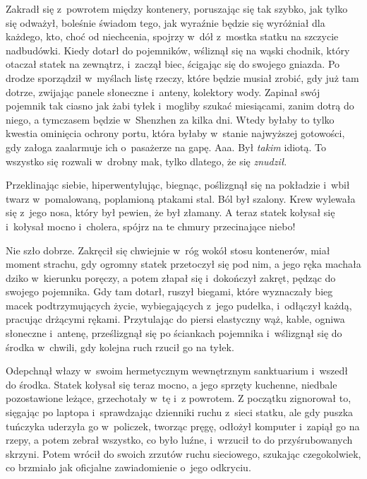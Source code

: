 \documentclass[oneside,polish,11pt,rmheadings]{mwbk}
\begin{document}
Zakradł się z~powrotem między kontenery, poruszając się tak szybko, jak tylko się odważył, boleśnie świadom tego, jak wyraźnie będzie się wyróżniał dla każdego, kto, choć od niechcenia, spojrzy w~dół z~mostka statku na szczycie nadbudówki. Kiedy dotarł do pojemników, wśliznął się na wąski chodnik, który otaczał statek na zewnątrz, i~zaczął biec, ścigając się do swojego gniazda. Po drodze sporządził w~myślach listę rzeczy, które będzie musiał zrobić, gdy już tam dotrze, zwijając panele słoneczne i~anteny, kolektory wody. Zapinał swój pojemnik tak ciasno jak żabi tyłek i~mogliby szukać miesiącami, zanim dotrą do niego, a tymczasem będzie w~Shenzhen za kilka dni. Wtedy byłaby to tylko kwestia ominięcia ochrony portu, która byłaby w~stanie najwyższej gotowości, gdy załoga zaalarmuje ich o~pasażerze na gapę. Aaa. Był \textit{takim }idiotą. To wszystko się rozwali w~drobny mak, tylko dlatego, że się \textit{znudził}.

Przeklinając siebie, hiperwentylując, biegnąc, poślizgnął się na pokładzie i~wbił twarz w~pomalowaną, poplamioną ptakami stal. Ból był szalony. Krew wylewała się z~jego nosa, który był pewien, że był złamany. A teraz statek kołysał się i~kołysał mocno i~cholera, spójrz na te chmury przecinające niebo!

Nie szło dobrze. Zakręcił się chwiejnie w~róg wokół stosu kontenerów, miał moment strachu, gdy ogromny statek przetoczył się pod nim, a jego ręka machała dziko w~kierunku poręczy, a potem złapał się i~dokończył zakręt, pędząc do swojego pojemnika. Gdy tam dotarł, ruszył biegami, które wyznaczały bieg macek podtrzymujących życie, wybiegających z~jego pudełka, i~odłączył każdą, pracując drżącymi rękami. Przytulając do piersi elastyczny wąż, kable, ogniwa słoneczne i~antenę, prześlizgnął się po ściankach pojemnika i~wślizgnął się do środka w~chwili, gdy kolejna ruch rzucił go na tyłek.

Odepchnął włazy w~swoim hermetycznym wewnętrznym sanktuarium i~wszedł do środka. Statek kołysał się teraz mocno, a jego sprzęty kuchenne, niedbale pozostawione leżące, grzechotały w~tę i~z powrotem. Z początku zignorował to, sięgając po laptopa i~sprawdzając dzienniki ruchu z~sieci statku, ale gdy puszka tuńczyka uderzyła go w~policzek, tworząc pręgę, odłożył komputer i~zapiął go na rzepy, a potem zebrał wszystko, co było luźne, i~wrzucił to do przyśrubowanych skrzyni. Potem wrócił do swoich zrzutów ruchu sieciowego, szukając czegokolwiek, co brzmiało jak oficjalne zawiadomienie o~jego odkryciu.
\end{document}
